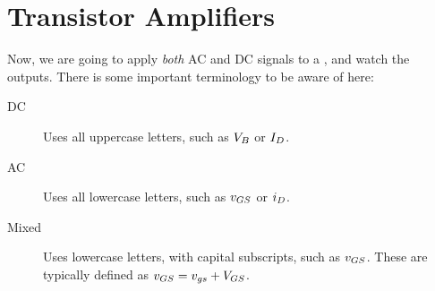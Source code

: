 \section{Transistor Amplifiers}\label{sec:Transistor_Amps}
Now, we are going to apply \emph{both} AC and DC signals to a , and watch the outputs.
There is some important terminology to be aware of here:
\begin{description}
\item[DC] Uses all uppercase letters, such as $\DCVoltage{\Base}$ or $\DCCurrent{\Drain}$.
\item[AC] Uses all lowercase letters, such as $\ACVoltage{\Gate\Source}$ or $\ACCurrent{\Drain}$.
\item[Mixed] Uses lowercase letters, with capital subscripts, such as $\SignalVoltage{GS}$.
  These are typically defined as $\SignalVoltage{GS} = \ACVoltage{GS} + \DCVoltage{GS}$.
\end{description}



